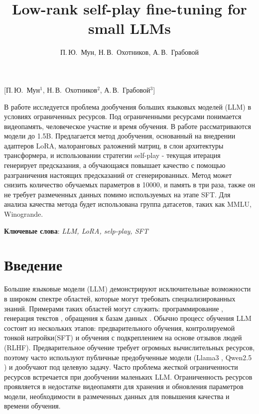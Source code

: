 \documentclass[12pt, twoside]{article}
\begin{document}
\title
    [] %
    {Low-rank self-play fine-tuning for small LLMs}
\author
    [] %
    {П.\,Ю.~Мун, Н.\,В.~Охотников, А.\,В.~Грабовой} %
    [П.\,Ю.~Мун$^1$, Н.\,В.~Охотников$^2$, А.\,В.~Грабовой$^3$] %

\abstract
  {В работе исследуется проблема дообучения больших языковых моделей (LLM) в условиях ограниченных ресурсов. Под ограниченными ресурсами понимается видеопамять, человеческое участие и время обучения. В работе рассматриваются модели до 1.5B. Предлагается метод дообучения, основанный на внедрении адаптеров LoRA, малоранговых раложений матриц, в слои архитектуры трансформера, и использовании стратегии self-play - текущая итерация генерирует предсказания, а обучающаяся повышает качество с помощью разграничения настоящих предсказаний от сгенерированных. Метод может снизить количество обучаемых параметров в 10000, и память в три раза, также он не требует размеченных данных помимо используемых на этапе SFT. Для анализа качества метода будет использована группа датасетов, таких как MMLU, Winogrande.


\bigskip
\noindent
\textbf{Ключевые слова}: \emph {LLM, LoRA, selp-play, SFT}
}
\doi{}
\receivedRus{}
\receivedEng{}

\maketitle
\linenumbers
\section{Введение}
Большие языковые модели (LLM) демонстрируют исключительные возможности в широком спектре областей, которые могут требовать специализированных знаний. Примерами таких областей могут служить: программирование \parencite{Chen2021}, генерация текстов \parencite{Touvron2023}, обращения к базам данных \parencite{Zhong2017}. Обычно процесс обучения LLM состоит из нескольких этапов: предварительного обучения, контролируемой тонкой натройки(SFT) и обучения с подкреплением на основе отзывов людей (RLHF). Предварительное обучение требует огромных вычислительных ресурсов, поэтому часто используют публичные предобученные модели (Llama3 \parencite{Dubey2024}, Qwen2.5 \parencite{Yang2025}) и дообучают под целевую задачу. Часто проблема жесткой ограниченности ресурсов встречается при дообучении маленьких LLM. Ограниченность ресурсов проявляется в недостатке видеопамяти для хранения и обновления параметров модели, необходимости в размеченных данных для повышения качества и времени обучения.
\end{document}

